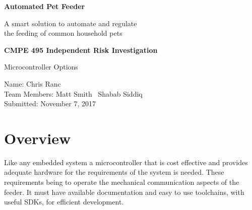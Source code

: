 \documentclass[12pt]{article}
\newcommand{\projectDescription}{A smart solution to automate and regulate \\the feeding of common household pets}
\newcommand{\projectTitle}{Automated Pet Feeder}
\newcommand{\yourname}{Chris Ranc}
\newcommand{\myname}{Matt Smith}
\newcommand{\anothername}{Shabab Siddiq}
\newcommand{\dateSubmitted}{November 7, 2017}
\newcommand{\componentDescription}{Microcontroller Options}
\begin{document}
    
\thispagestyle{empty}
    \vspace*{2.5cm} 
    \begin{center}
        \LARGE
        \textbf{\projectTitle}

        \Large
        \projectDescription

    \vspace*{2.5cm} 
        \large
        \textbf{CMPE 495 Independent Risk Investigation}

        \componentDescription
    \end{center}
    
    \vspace*{2cm}
    
    \begin{multicols}{2}
        \phantom{LaTeX doesn't like empty columns} %
        \columnbreak{}
        \begin{raggedright}
            
        Name: \yourname\\
        Team Members: \myname\
        \phantom{Team Members:} \anothername\\
        Submitted: \dateSubmitted\\
        \vspace{\baselineskip}
        \end{raggedright}
    \end{multicols}
\newpage
%
%
\renewcommand{\cftaftertoctitle}{\thispagestyle{empty}} 
\renewcommand\cftsecleader{\cftdotfill{\cftdotsep}}
\tableofcontents
\newpage

\section{Overview}
Like any embedded system a microcontroller that is cost effective and provides adequate hardware
for the requirements of the system is needed.  These requirements being to operate the mechanical 
communication aspects of the feeder.  It must have available documentation and easy to use
toolchains, with useful SDKs, for efficient development.  
\end{document}
